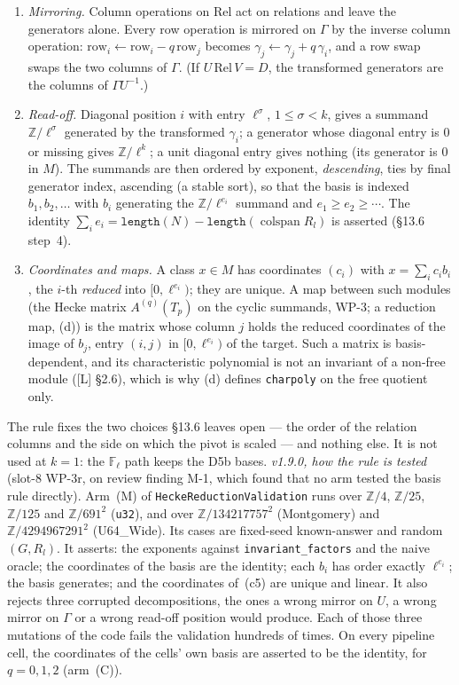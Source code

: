 \documentclass[11pt]{article}
\theoremstyle{remark}
\newcommand{\F}{\mathbb{F}}
\newcommand{\Z}{\mathbb{Z}}
\newcommand{\Fl}{\F_\ell}
\begin{document}
\begin{enumerate}[label=(c\arabic*)]
  elimination stops when every trailing entry is $0$.
\item \emph{Mirroring.} Column operations on $\mathrm{Rel}$ act on relations and leave the
  generators alone. Every row operation is mirrored on $\Gamma$ by the inverse column operation:
  $\mathrm{row}_i\leftarrow\mathrm{row}_i-q\,\mathrm{row}_j$ becomes
  $\gamma_j\leftarrow\gamma_j+q\,\gamma_i$, and a row swap swaps the two columns of $\Gamma$. (If
  $U\,\mathrm{Rel}\,V=D$, the transformed generators are the columns of $\Gamma U^{-1}$.)
\item \emph{Read-off.} Diagonal position $i$ with entry $\ell^\sigma$, $1\le\sigma<k$, gives a
  summand $\Z/\ell^\sigma$ generated by the transformed $\gamma_i$; a generator whose diagonal
  entry is $0$ or missing gives $\Z/\ell^k$; a unit diagonal entry gives nothing (its generator is
  $0$ in $M$). The summands are then ordered by exponent, \emph{descending}, ties by final
  generator index, ascending (a stable sort), so that the basis is indexed $b_1,b_2,\dots$ with
  $b_i$ generating the $\Z/\ell^{e_i}$ summand and $e_1\ge e_2\ge\cdots$. The identity
  $\sum_ie_i=\texttt{length}(N)-\texttt{length}(\operatorname{colspan}R_l)$ is asserted (\S13.6
  step~4).
\item \emph{Coordinates and maps.} A class $x\in M$ has coordinates $(c_i)$ with
  $x=\sum_ic_ib_i$, the $i$-th \emph{reduced} into $[0,\ell^{e_i})$; they are unique. A map
  between such modules (the Hecke matrix $A^{(q)}(T_p)$ on the cyclic summands, WP-3; a reduction
  map, (d)) is the matrix whose column $j$ holds the reduced coordinates of the image of $b_j$,
  entry $(i,j)$ in $[0,\ell^{e_i})$ of the target. Such a matrix is basis-dependent, and its
  characteristic polynomial is not an invariant of a non-free module ([L] \S2.6), which is why (d)
  defines \texttt{charpoly} on the free quotient only.
\end{enumerate}
The rule fixes the two choices \S13.6 leaves open --- the order of the relation columns and the
side on which the pivot is scaled --- and nothing else. It is not used at $k=1$: the $\Fl$ path
keeps the D5b bases. \emph{v1.9.0, how the rule is tested} (slot-8 WP-3r, on review finding M-1,
which found that no arm tested the basis rule directly). Arm~(M) of \texttt{HeckeReductionValidation}
runs over $\Z/4$, $\Z/25$, $\Z/125$ and $\Z/691^2$ (\texttt{u32}), and over $\Z/134217757^2$
(Montgomery) and $\Z/4294967291^2$ (U64\_Wide). Its cases are fixed-seed known-answer and random
$(G,R_l)$. It asserts: the exponents against \texttt{invariant\_factors} and the naive oracle; the
coordinates of the basis are the identity; each $b_i$ has order exactly $\ell^{e_i}$; the basis
generates; and the coordinates of~(c5) are unique and linear. It also rejects three corrupted
decompositions, the ones a wrong mirror on $U$, a wrong mirror on $\Gamma$ or a wrong read-off
position would produce. Each of those three mutations of the code fails the validation hundreds of
times. On every pipeline cell, the coordinates of the cells' own basis are asserted to be the
identity, for $q=0,1,2$ (arm~(C)).
\end{document}
